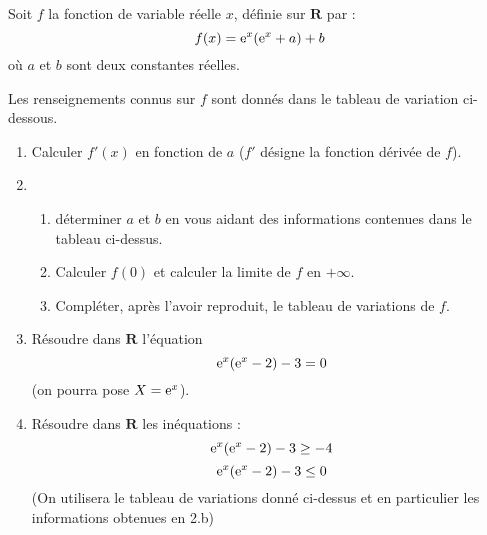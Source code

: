   Soit $f$ la fonction de variable réelle $x$, définie sur $\mathbf{R}$ par :
  \[
      f(x)=\mathrm{e}^x(\mathrm{e}^x+a)+b
  \]
  où $a$ et $b$ sont deux constantes réelles.

  Les renseignements connus sur $f$ sont donnés dans le tableau de variation ci-dessous.
   
  \medskip
  \begin{center}
  \end{center}

  \medskip
  \begin{enumerate}
      \item Calculer $f'(x)$ en fonction de $a$ ($f'$ désigne la fonction dérivée de $f$).
      \item \begin{enumerate}
             \item déterminer $a$ et $b$ en vous aidant des informations contenues dans le
              tableau ci-dessus.
             \item Calculer $f(0)$ et calculer la limite de $f$ en $+\infty$.
             \item Compléter, après l'avoir reproduit, le tableau de variations de $f$.
             \end{enumerate}
      \item Résoudre dans $\mathbf{R}$ l'équation 
      \[
          \mathrm{e}^x(\mathrm{e}^x-2)-3=0
      \]
      (on pourra pose $X=\mathrm{e}^x$).
      \item Résoudre dans $\mathbf{R}$ les inéquations : 
      \[
          \mathrm{e}^x(\mathrm{e}^x-2)-3\geq -4
      \]
      \[
          \mathrm{e}^x(\mathrm{e}^x-2)-3 \leq 0
      \]
       (On utilisera le tableau de variations donné ci-dessus et en particulier les
        informations obtenues en 2.b)
  \end{enumerate}

